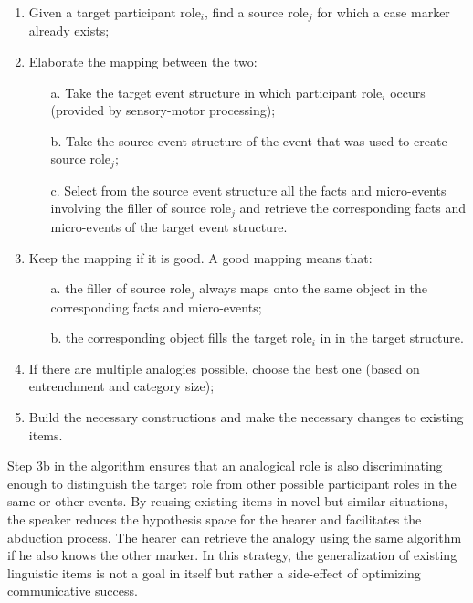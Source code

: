\begin{enumerate}
\item Given a target participant role$_{i}$, find a source role$_{j}$ for which a case marker already exists;
\newpage
\item Elaborate the mapping between the two:
\begin{enumerate}
\item[a.] Take the target event structure in which participant role$_{i}$ occurs (provided by sensory-motor processing);
\item[b.] Take the source event structure of the event that was used to create source role$_{j}$;
\item[c.] Select from the source event structure all the facts and micro-events involving the filler of source role$_{j}$ and retrieve the corresponding facts and micro-events of the target event structure. 
\end{enumerate}
\item Keep the mapping if it is good. A good mapping means that:
\begin{enumerate}
\item[a.] the filler of source role$_{j}$ always maps onto the same object in the corresponding facts and micro-events;
\item[b.] the corresponding object fills the target role$_{i}$ in in the target structure.
\end{enumerate}
\item If there are multiple analogies possible, choose the best one (based on entrenchment and category size);
\item Build the necessary constructions and make the necessary changes to existing items.
\end{enumerate}

Step 3b in the algorithm ensures that an analogical role is also discriminating enough to distinguish the target role from other possible participant roles in the same or other events. By reusing existing items in novel but similar situations, the speaker reduces the hypothesis space for the hearer and facilitates the abduction process. The hearer can retrieve the analogy using the same algorithm if he also knows the other marker. In this strategy, the generalization of existing linguistic items is not a goal in itself but rather a side-effect of optimizing communicative success.


